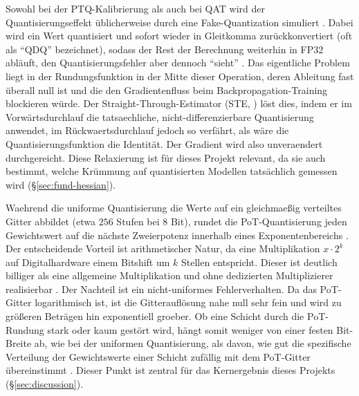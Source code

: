 Sowohl bei der PTQ-Kalibrierung als auch bei QAT wird der Quantisierungseffekt üblicherweise durch eine Fake-Quantization simuliert \citep{krishnamoorthi2018quantizing}. Dabei wird ein Wert quantisiert und sofort wieder in Gleitkomma zurückkonvertiert (oft als \enquote{QDQ} bezeichnet), sodass der Rest der Berechnung weiterhin in FP32 abläuft, den Quantisierungsfehler aber dennoch \enquote{sieht} \citep{krishnamoorthi2018quantizing}. Das eigentliche Problem liegt in der Rundungsfunktion in der Mitte dieser Operation, deren Ableitung fast überall null ist und die den Gradientenfluss beim Backpropagation-Training blockieren würde. Der Straight-Through-Estimator (STE, \cite{bengio_ste_2013}) löst dies, indem er im Vorwärtsdurchlauf die tatsaechliche, nicht-differenzierbare Quantisierung anwendet, im Rückwaertsdurchlauf jedoch so verfährt, als wäre die Quantisierungsfunktion die Identität. Der Gradient wird also unveraendert durchgereicht. Diese Relaxierung ist für dieses Projekt relevant, da sie auch bestimmt, welche Krümmung auf quantisierten Modellen tatsächlich gemessen wird (\S\ref{sec:fund-hessian}).
\par\medskip

Waehrend die uniforme Quantisierung die Werte auf ein gleichmaeßig verteiltes Gitter abbildet (etwa $256$ Stufen bei 8 Bit), rundet die PoT-Quantisierung jeden Gewichtswert auf die nächste Zweierpotenz innerhalb eines Exponentenbereichs \citep{miyashita_pot_2016}. Der entscheidende Vorteil ist arithmetischer Natur, da eine Multiplikation $x \cdot 2^k$ auf Digitalhardware einem Bitshift um $k$ Stellen entspricht. Dieser ist deutlich billiger als eine allgemeine Multiplikation und ohne dedizierten Multiplizierer realisierbar \citep{przewlocka_rus_pot_2022}. Der Nachteil ist ein nicht-uniformes Fehlerverhalten. Da das PoT-Gitter logarithmisch ist, ist die Gitterauflösung nahe null sehr fein und wird zu größeren Beträgen hin exponentiell groeber. Ob eine Schicht durch die PoT-Rundung stark oder kaum gestört wird, hängt somit weniger von einer festen Bit-Breite ab, wie bei der uniformen Quantisierung, als davon, wie gut die spezifische Verteilung der Gewichtswerte einer Schicht zufällig mit dem PoT-Gitter übereinstimmt \citep{miyashita_pot_2016}. Dieser Punkt ist zentral für das Kernergebnis dieses Projekts (\S\ref{sec:discussion}).
\par\medskip

